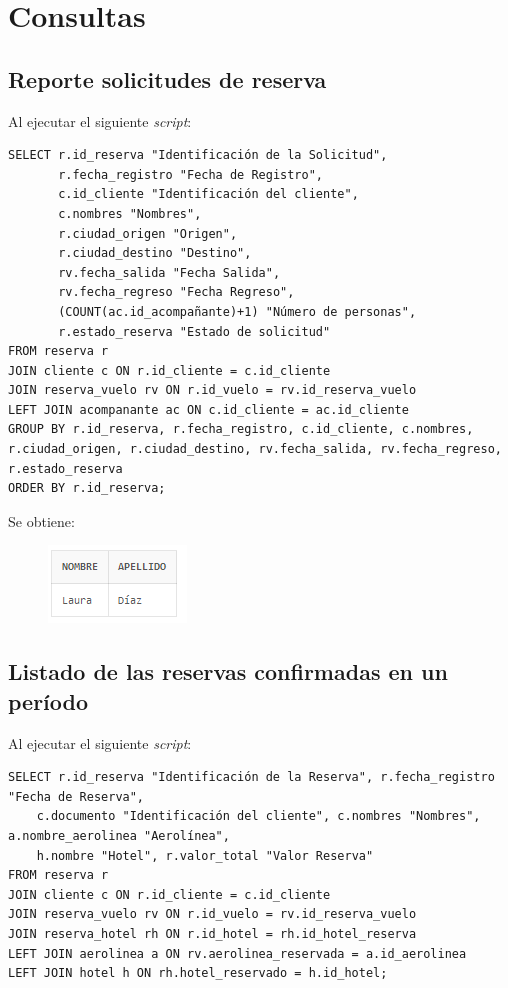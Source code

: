 \documentclass{article}
\begin{document}
\newpage
\section{Consultas}
\subsection{Reporte solicitudes de reserva}
Al ejecutar el siguiente \textit{script}:
\begin{lstlisting}
SELECT r.id_reserva "Identificación de la Solicitud", 
       r.fecha_registro "Fecha de Registro", 
       c.id_cliente "Identificación del cliente", 
       c.nombres "Nombres", 
       r.ciudad_origen "Origen", 
       r.ciudad_destino "Destino", 
       rv.fecha_salida "Fecha Salida", 
       rv.fecha_regreso "Fecha Regreso",
       (COUNT(ac.id_acompañante)+1) "Número de personas", 
       r.estado_reserva "Estado de solicitud"
FROM reserva r
JOIN cliente c ON r.id_cliente = c.id_cliente
JOIN reserva_vuelo rv ON r.id_vuelo = rv.id_reserva_vuelo
LEFT JOIN acompanante ac ON c.id_cliente = ac.id_cliente
GROUP BY r.id_reserva, r.fecha_registro, c.id_cliente, c.nombres, r.ciudad_origen, r.ciudad_destino, rv.fecha_salida, rv.fecha_regreso, r.estado_reserva
ORDER BY r.id_reserva;
\end{lstlisting}

Se obtiene:

\begin{figure}[h]
    \centering
    \includegraphics[width=1\linewidth]{img/Consulta_1.png}
\end{figure}

\newpage

\subsection{Listado de las reservas confirmadas en un período}
Al ejecutar el siguiente \textit{script}:
\begin{lstlisting}
SELECT r.id_reserva "Identificación de la Reserva", r.fecha_registro "Fecha de Reserva",
    c.documento "Identificación del cliente", c.nombres "Nombres", a.nombre_aerolinea "Aerolínea",
    h.nombre "Hotel", r.valor_total "Valor Reserva"
FROM reserva r
JOIN cliente c ON r.id_cliente = c.id_cliente
JOIN reserva_vuelo rv ON r.id_vuelo = rv.id_reserva_vuelo
JOIN reserva_hotel rh ON r.id_hotel = rh.id_hotel_reserva
LEFT JOIN aerolinea a ON rv.aerolinea_reservada = a.id_aerolinea
LEFT JOIN hotel h ON rh.hotel_reservado = h.id_hotel;
\end{lstlisting}
\end{document}
